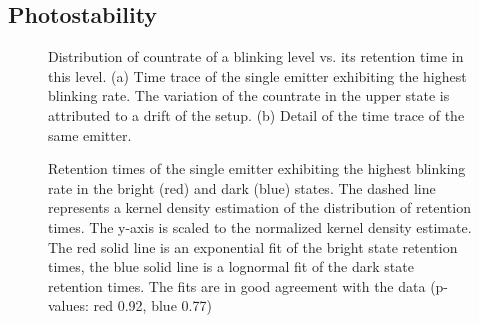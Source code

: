 



	\subsection{Photostability} \label{subsec::photostab}


	\begin{figure}[tp]
		\begin{subfigure}[tp]{ 0.49\linewidth}
			\caption{}\label{subfig::blink_long}
			\centering
		\end{subfigure}
		\hfill
		\begin{subfigure}[tp]{ 0.49\linewidth}
			\caption{}\label{subfig::blink_short}
			\centering
		\end{subfigure}
		\caption{Distribution of countrate of a blinking level vs. its retention time in this level. (a) Time trace of the single emitter exhibiting the highest blinking rate. The variation of the countrate in the upper state is attributed to a drift of the setup. (b) Detail of the time trace of the same emitter.}
		\label{fig::blink}
	\end{figure}

	\begin{figure}[tp]
		\centering
		\caption{Retention times of the single emitter exhibiting the highest blinking rate in the bright (red) and dark (blue) states. The dashed line represents a kernel density estimation of the distribution of retention times. The y-axis is scaled to the normalized kernel density estimate. The red solid line is an exponential fit of the bright state retention times, the blue solid line is a lognormal fit of the dark state retention times. The fits are in good agreement with the data (p-values: red 0.92, blue 0.77)}
		\label{fig::fit_blink_distr}
	\end{figure}

